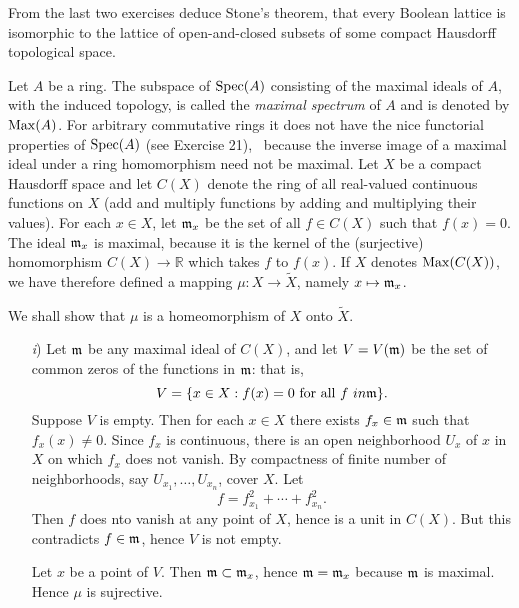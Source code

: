 \documentclass[10pt]{amsart}
\begin{document}
\begin{exercise}
    From the last two exercises deduce Stone's theorem, that every Boolean lattice is
    isomorphic to the lattice of open-and-closed subsets of some compact Hausdorff topological 
    space.
\end{exercise}

\begin{exercise}
    Let $A$ be a ring. The subspace of $\operatorname{Spec}(A)$ consisting of the maximal ideals of $A$, with the induced topology, is called the \emph{maximal spectrum} 
    of $A$ and is denoted by $\operatorname{Max}(A)$. For arbitrary commutative rings it does not have the nice functorial properties of $\operatorname{Spec}(A)$ (see Exercise 21), \
    because the inverse image of a maximal ideal under a ring homomorphism need not be maximal.
    Let $X$ be a compact Hausdorff space and let $C(X)$ denote the ring of all real-valued continuous functions on $X$ (add and multiply functions by adding
    and multiplying their values). For each  $x \in X$, let $\mathfrak{m}_x$ be the set of all $f \in C(X)$ such that 
    $f(x) = 0$. The ideal $\mathfrak{m}_x$ is maximal, because it is the kernel of the (surjective) homomorphism $C(X) \to \mathbb{R}$ 
    which takes $f$ to $f(x)$. If $X$ denotes $\operatorname{Max} (C(X))$, we have therefore defined a mapping $\mu: X \to \tilde{X}$, namely $x \mapsto \mathfrak{m}_x$.

    We shall show that $\mu$ is a homeomorphism of $X$ onto $\tilde{X}$.

    \begin{itemize}
        \item[\emph{i})] Let $\mathfrak{m}$ be any maximal ideal of $C(X)$, and let $V = V(\mathfrak{m})$ be the 
        set of common zeros of the functions in $\mathfrak{m}$: that is,
        \[
            V = \{ x \in X : f(x) = 0 \text{ for all } f\ in \mathfrak{m} \}.
        \]
        Suppose $V$ is empty. Then for each $x \in X$ there exists $f_x \in \mathfrak{m}$ such that 
        $f_x(x) \ne 0$. Since $f_x$ is continuous, there is an open neighborhood $U_x$ of $x$ in $X$ 
        on which $f_x$ does not vanish. By compactness of finite number of neighborhoods, say $U_{x_1}, \dots, U_{x_n}$, cover $X$. 
        Let 
        \[
            f = f_{x_1}^2 + \cdots + f_{x_n}^2.
        \]
        Then $f$ does nto vanish at any point of $X$, hence is a unit in $C(X)$. But this contradicts $f \in \mathfrak{m}$, hence $V$ is not empty. 
        
        Let $x$ be a point of $V$. Then $\mathfrak{m} \subset \mathfrak{m}_x$, hence $\mathfrak{m} = \mathfrak{m}_x$ because $\mathfrak{m}$ is maximal. 
        Hence $\mu$ is sujrective.
        

\end{itemize}
\end{exercise}
\end{document}
